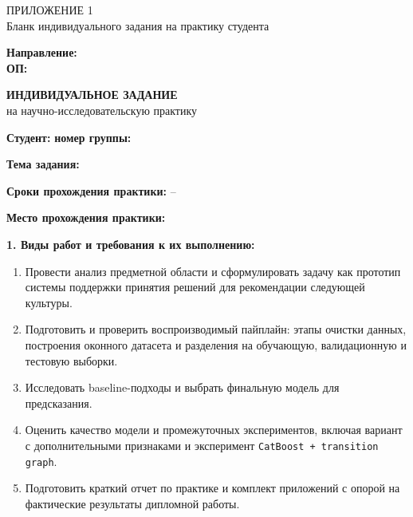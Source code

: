 \begin{flushright}
{\large ПРИЛОЖЕНИЕ 1}\\[0.5em]
Бланк индивидуального задания на практику студента
\end{flushright}

\vspace{1em}

\begin{center}
\textbf{\MakeUppercase{\UniversityName}}
\end{center}

\noindent\textbf{Направление:} \DirectionName\\
\textbf{ОП:} \ProgramName

\vspace{1.5em}

\begin{center}
{\Large\bfseries ИНДИВИДУАЛЬНОЕ ЗАДАНИЕ}\\[0.3em]
на научно-исследовательскую практику
\end{center}

\vspace{1em}

\noindent\textbf{Студент:} \StudentName \hfill \textbf{номер группы:} \StudentGroup

\noindent\textbf{Тема задания:} \PracticeTheme

\noindent\textbf{Сроки прохождения практики:} \PracticeStart{} -- \PracticeEnd

\noindent\textbf{Место прохождения практики:} \PracticePlace

\vspace{0.75em}

\noindent\textbf{1. Виды работ и требования к их выполнению:}
\begin{enumerate}[leftmargin=1.5em]
\item Провести анализ предметной области и сформулировать задачу как прототип системы поддержки принятия решений для рекомендации следующей культуры.
\item Подготовить и проверить воспроизводимый пайплайн: этапы очистки данных, построения оконного датасета и разделения на обучающую, валидационную и тестовую выборки.
\item Исследовать baseline-подходы и выбрать финальную модель для предсказания.
\item Оценить качество модели и промежуточных экспериментов, включая вариант с дополнительными признаками и эксперимент \texttt{CatBoost + transition graph}.
\item Подготовить краткий отчет по практике и комплект приложений с опорой на фактические результаты дипломной работы.
\end{enumerate}

